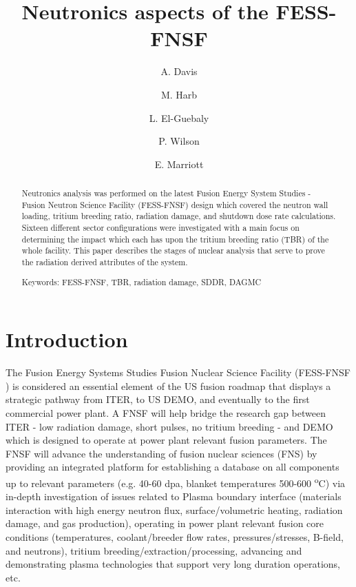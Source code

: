 \documentclass[12pt, letterpaper]{elsarticle}
\title{Neutronics aspects of the FESS-FNSF}
\author[wisc]{A. Davis\corref{cor1}}
\author[wisc]{M. Harb}
\author[wisc]{L. El-Guebaly}
\author[wisc]{P. Wilson}
\author[wisc]{E. Marriott}
\begin{document}
 
\begin{abstract}
Neutronics analysis was performed on the latest Fusion Energy System Studies - Fusion Neutron Science Facility (FESS-FNSF) design which covered the neutron wall loading, tritium breeding ratio, radiation damage, and shutdown dose rate calculations. Sixteen different sector configurations were investigated with a main focus on determining the impact which each has upon the tritium breeding ratio (TBR) of the whole facility. This paper describes the stages of nuclear analysis that serve to prove the radiation derived attributes of the system.

\vspace{5mm}
\noindent
Keywords: FESS-FNSF, TBR, radiation damage, SDDR, DAGMC
\end{abstract}

\begin{titlepage}
\maketitle
\end{titlepage}

\newpage
\listoffigures

\newpage
\section{Introduction}
The Fusion Energy Systems Studies Fusion Nuclear Science Facility (FESS-FNSF \cite{ref_1}) is considered an essential element of the US fusion roadmap that displays a strategic  pathway from ITER, to US DEMO, and eventually to the first commercial power plant. A FNSF will help bridge the research gap between ITER - low radiation damage, short pulses, no tritium breeding - and DEMO which is designed to operate at power plant relevant fusion parameters. The FNSF will advance the understanding of fusion nuclear sciences (FNS) by providing an integrated platform for establishing a database on all components up to relevant parameters (e.g. 40-60 dpa, blanket temperatures 500-600 \textsuperscript{o}C) via in-depth investigation of issues related to Plasma boundary interface (materials interaction with high energy neutron flux, surface/volumetric heating, radiation damage, and gas production), operating in power plant relevant fusion core conditions (temperatures, coolant/breeder flow rates, pressures/stresses, B-field, and neutrons), tritium breeding/extraction/processing, advancing and demonstrating plasma technologies that support very long duration operations, etc.  
\end{document}
